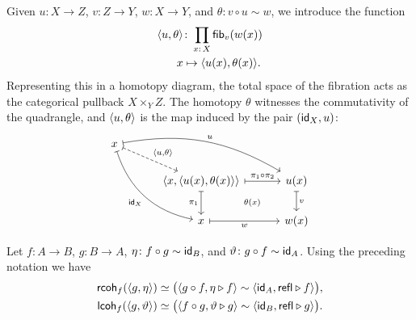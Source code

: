 \begin{ntn}\label{ntn:fib-pullback}
    Given\/ $u\colon X\to Z$, $v\colon Z\to Y$, $w\colon X\to Y$, and\/ $\theta\colon v\circ u\sim w$, we introduce the function
    \begin{align*}
        \dep{u,\theta}
            &\colon\prod_{x\colon X}\fun{fib}_v(w(x))\\
        x&\mapsto\dep{u(x),\theta(x)}.
    \end{align*}
    Representing this in a homotopy diagram, the total space of the fibration acts as the categorical pullback\/ $X\times_Y Z$. The homotopy\/ $\theta$ witnesses the commutativity of the quadrangle, and\/ $\langle u,\theta\rangle$ is the map induced by the pair\/ $(\mathsf{id}_X,u)$:
    \[
        \begin{tikzcd}[arrows={|->}, column sep=1.1cm]
            x
                \arrow[rd, dashed, "\dep{u,\theta}"]
                \arrow[rdd, "\id_X"', bend right=30]
                \arrow[rrd, "u", bend left=20]\\
            & \dep{x,\dep{u(x),\theta(x)}}
                \arrow[r, "\pi_1\circ\pi_2"]
                \arrow[d, "\pi_1"']
                \arrow[rd, phantom, "\scriptstyle\theta(x)"]
            & u(x)
                \arrow[d, "v"]\\
            & x
                \arrow[r, "w"']
            & w(x)
        \end{tikzcd}
    \]
\end{ntn}

\begin{lem}\label{lem:side-coherences-equivalence}
    Let\/ $f\colon A\to B$, $g\colon B\to A$, $\eta\colon f\circ g\sim\id_B$, and\/ $\vartheta\colon g\circ f\sim\id_A$. Using the preceding notation we have
    \begin{align*}
        \mathsf{rcoh}_f(\langle g,\eta\rangle)
            &\simeq
                \bigl(
                    \langle g\circ f,\eta\triangleright f\rangle
                        \sim\langle\mathsf{id}_A,\mathsf{refl}\triangleright f\rangle
                \bigr),\\
        \mathsf{lcoh}_f(\langle g,\vartheta\rangle)
            &\simeq
                \bigl(
                    \langle f\circ g,\vartheta\triangleright g\rangle
                        \sim\langle\mathsf{id}_B,\mathsf{refl}\triangleright g\rangle
                \bigr).
    \end{align*}
\end{lem}

